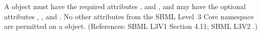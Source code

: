 A \Reaction object must have the required attributes ,
 and  , and may have the optional attributes
, ,  and .  No
other attributes from the SBML Level~3 Core namespace are permitted on a
\Reaction object.  (References: SBML L3V1 Section 4.11; SBML L3V2 .)
